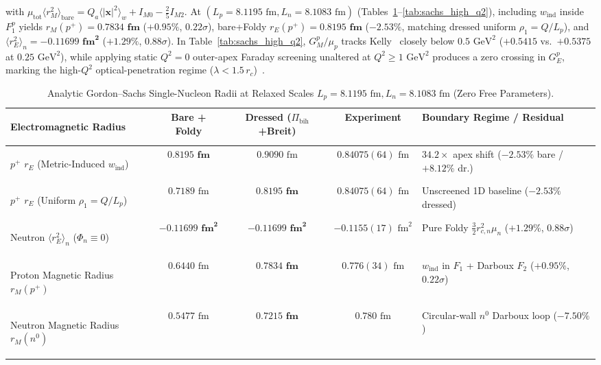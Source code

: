 \documentclass[11pt, a4paper]{article}
\begin{document}
with $\mu_{\mathrm{tot}}\langle r_M^2\rangle_{\mathrm{bare}} = Q_a\langle |\mathbf{x}|^2\rangle_{w} + I_{M0} - \frac{2}{5}I_{M2}$. At $(L_p = 8.1195\text{ fm}, L_n = 8.1083\text{ fm})$ (Tables~\ref{tab:sachs_radii}--\ref{tab:sachs_high_q2}), including $w_{\mathrm{ind}}$ inside $F_1^p$ yields $r_M(p^+) = \mathbf{0.7834\text{ fm}}$ ($+0.95\%$, $0.22\sigma$), bare+Foldy $r_E(p^+) = \mathbf{0.8195\text{ fm}}$ ($-2.53\%$, matching dressed uniform $\rho_1 = Q/L_p$), and $\langle r_E^2\rangle_n = \mathbf{-0.11699\text{ fm}^2}$ ($+1.29\%$, $0.88\sigma$). In Table~\ref{tab:sachs_high_q2}, $G_M^p/\mu_p$ tracks Kelly~\cite{kelly2004} closely below $0.5\text{ GeV}^2$ ($+0.5415$ vs.\ $+0.5375$ at $0.25\text{ GeV}^2$), while applying static $Q^2 = 0$ outer-apex Faraday screening unaltered at $Q^2 \ge 1\text{ GeV}^2$ produces a zero crossing in $G_E^p$, marking the high-$Q^2$ optical-penetration regime ($\lambda < 1.5\,r_c$)~\cite{bairmosheh2026}.

\begin{table}[!htbp]
\centering
\caption{Analytic Gordon--Sachs Single-Nucleon Radii at Relaxed Scales $L_p = 8.1195\text{ fm}, L_n = 8.1083\text{ fm}$ (Zero Free Parameters).}
\label{tab:sachs_radii}
\footnotesize
\setlength{\tabcolsep}{4pt}
\renewcommand{\arraystretch}{1.18}
\begin{tabularx}{\textwidth}{>{\bfseries\raggedright\arraybackslash}p{} c c c >{\raggedright\arraybackslash}X}
\toprule
Electromagnetic Radius & Bare + Foldy & Dressed ($\Pi_{\mathrm{bih}}$+Breit) & Experiment & Boundary Regime / Residual \\
\midrule
$p^+$ $r_E$ (Metric-Induced $w_{\mathrm{ind}}$) & $\mathbf{0.8195\text{ fm}}$ & $0.9090\text{ fm}$ & $0.84075(64)\text{ fm}$ & $34.2\times$ apex shift ($-2.53\%$ bare / $+8.12\%$ dr.) \\
$p^+$ $r_E$ (Uniform $\rho_1 = Q/L_p$) & $0.7189\text{ fm}$ & $\mathbf{0.8195\text{ fm}}$ & $0.84075(64)\text{ fm}$ & Unscreened 1D baseline ($-2.53\%$ dressed) \\
Neutron $\langle r_E^2\rangle_n$ ($\Phi_n \equiv 0$) & $\mathbf{-0.11699\text{ fm}^2}$ & $\mathbf{-0.11699\text{ fm}^2}$ & $-0.1155(17)\text{ fm}^2$ & Pure Foldy $\frac{3}{2}r_{c,n}^2\mu_n$ ($+1.29\%$, $0.88\sigma$) \\
Proton Magnetic Radius $r_M(p^+)$ & $0.6440\text{ fm}$ & $\mathbf{0.7834\text{ fm}}$ & $0.776(34)\text{ fm}$ & $w_{\mathrm{ind}}$ in $F_1$ + Darboux $F_2$ ($+0.95\%$, $0.22\sigma$) \\
Neutron Magnetic Radius $r_M(n^0)$ & $0.5477\text{ fm}$ & $\mathbf{0.7215\text{ fm}}$ & $0.780\text{ fm}$ & Circular-wall $n^0$ Darboux loop ($-7.50\%$) \\
\bottomrule
\end{tabularx}
\end{table}
\end{document}
